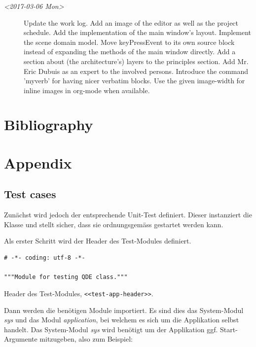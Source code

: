 \documentclass[10pt, openright, notitlepage]{scrreprt}
\begin{document}
\begin{description}
\item[{\textit{<2017-03-06 Mon>}}] Update the work log. Add an image of the editor as well as
the project schedule. Add the implementation of the main window's layout.
Implement the scene domain model. Move keyPressEvent to its own source
block instead of expanding the methods of the main window directly. Add a
section about (the architecture's) layers to the principles section. Add
Mr. Eric Dubuis as an expert to the involved persons. Introduce the command
'myverb' for having nicer verbatim blocks. Use the given image-width for
inline images in org-mode when available.
\end{description}

\chapter{Bibliography}
\label{sec:org531f156}

\printbibliography{}

\chapter{Appendix}
\label{sec:org12f633f}

\section{Test cases}
\label{sec:orgc1b6e68}

Zunächst wird jedoch der entsprechende Unit-Test definiert. Dieser instanziert
die Klasse und stellt sicher, dass sie ordnungsgemäss gestartet werden kann.

Als erster Schritt wird der Header des Test-Modules definiert.

\begin{listing}[H]
\begin{verbatim}
# -*- coding: utf-8 -*-

"""Module for testing QDE class."""
\end{verbatim}
\caption{\label{test-app-header}
Header des Test-Modules, \texttt{<<test-app-header>>}.}
\end{listing}

Dann werden die benötigen Module importiert. Es sind dies das System-Modul
\emph{sys} und das Modul \emph{application}, bei welchem es sich um die Applikation
selbst handelt. Das System-Modul \emph{sys} wird benötigt um der Applikation ggf.
Start-Argumente mitzugeben, also zum Beispiel:
\end{document}
